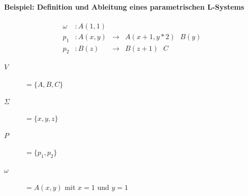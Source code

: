 \newpage
\paragraph{Beispiel: Definition und Ableitung eines parametrischen L-Systems \\}

\begin{equation}
\begin{array}{llll}
\omega & : A(1,1) \\
p_1 & : A(x,y) &\rightarrow& A(x+1, y*2)\text{ }B(y) \\
p_2 &  : B(z) &\rightarrow& B(z+1)\text{ }C 
\end{array}
\label{eq:ProdParamLSystem}
\end{equation} 


\begin{description}
	\item[\boldmath$V$ ]  $= \{A,B,C\}$\\
	
	\item[\boldmath$\Sigma$ ] $= \{x,y,z\}$\\
	
	\item[\boldmath$P$ ] $= \{p_1, p_2\}$\\
	
	\item[\boldmath$\omega$ ]  $= A(x,y)$ mit $x=1$ und $y=1$
\end{description}





